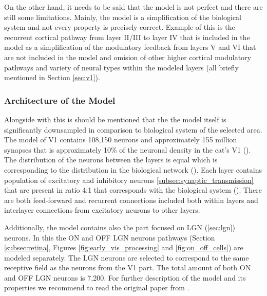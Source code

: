 On the other hand, it needs to be said that the model is not perfect and there are still some limitations. Mainly, the model is a simplification of the biological system and not every property is precisely correct. Example of this is the recurrent cortical pathway from layer II/III to layer IV that is included in the model as a simplification of the modulatory feedback from layers V and VI that are not included in the model and omision of other higher cortical modulatory pathways and variety of neural types within the modeled layers (all briefly mentioned in Section \ref{sec:v1}). 

\subsubsection{Architecture of the Model}
\label{subsubsec:spiking_cat_architecture}
Alongside with this is should be mentioned that the the model itself is significantly downsampled in comparison to biological system of the selected area. The model of V1 contains 108,150 neurons and approximately 155 million synapses that is approximately 10\% of the neuronal density in the cat's V1 (\citet{beaulie1989number}). The distribution of the neurons between the layers is equal which is corresponding to the distribution in the biological network (\citet{beaulie1989number}). Each layer contains population of excitatory and inhibitory neurons \ref{subsec:synaptic_transmission} that are present in ratio 4:1 that corresponds with the biological system (\citet{bealuliee1992quantitative, markram_interneurons_2004}). There are both feed-forward and recurrent connections included both within layers and interlayer connections from excitatory neurons to other layers.

Additionally, the model contains also the part focused on LGN (\ref{sec:lgn}) neurons. In this the ON and OFF LGN neurons pathways (Section \ref{subsec:retina}, Figures \ref{fig:early_vis_processing} and \ref{fig:on_off_cells}) are modeled separately. The LGN neurons are selected to correspond to the same receptive field as the neurons from the V1 part. The total amount of both ON and OFF LGN neurons is 7,200. For further description of the model and its properties we recommend to read the original paper from \citet{antolik2024comprehensive}.

